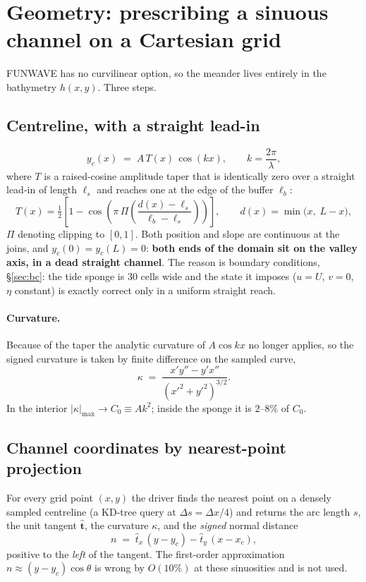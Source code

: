 \documentclass[11pt,a4paper]{article}
\begin{document}
\section{Geometry: prescribing a sinuous channel on a Cartesian grid}
\label{sec:geom}

FUNWAVE has no curvilinear option, so the meander lives entirely in the bathymetry
$h(x,y)$. Three steps.

\subsection{Centreline, with a straight lead-in}
\begin{equation}
  y_c(x) \;=\; A\,T(x)\,\cos(kx), \qquad k=\frac{2\pi}{\lambda},
  \label{eq:centreline}
\end{equation}
where $T$ is a raised-cosine amplitude taper that is identically zero over a straight
lead-in of length $\ell_s$ and reaches one at the edge of the buffer $\ell_b$:
\begin{equation}
  T(x)=\tfrac12\left[1-\cos\!\left(\pi\,\Pi\!\left(\frac{d(x)-\ell_s}{\ell_b-\ell_s}\right)\right)\right],
  \qquad d(x)=\min\big(x,\;L-x\big),
  \label{eq:taper}
\end{equation}
$\Pi$ denoting clipping to $[0,1]$. Both position and slope are continuous at the joins,
and $y_c(0)=y_c(L)=0$: \textbf{both ends of the domain sit on the valley axis, in a dead
straight channel}. The reason is boundary conditions, \S\ref{sec:bc}: the tide sponge is
30 cells wide and the state it imposes ($u=U$, $v=0$, $\eta$ constant) is exactly correct
only in a uniform straight reach.

\paragraph{Curvature.} Because of the taper the analytic curvature of $A\cos kx$ no longer
applies, so the signed curvature is taken by finite difference on the sampled curve,
\begin{equation}
  \kappa \;=\; \frac{x'y''-y'x''}{\left(x'^2+y'^2\right)^{3/2}} .
  \label{eq:kappa}
\end{equation}
In the interior $|\kappa|_{\max}\to C_0\equiv Ak^2$; inside the sponge it is $2$--$8\%$ of
$C_0$.

\subsection{Channel coordinates by nearest-point projection}
For every grid point $(x,y)$ the driver finds the nearest point on a densely sampled
centreline (a KD-tree query at $\Delta s=\Delta x/4$) and returns the arc length $s$, the
unit tangent $\hat{\bm t}$, the curvature $\kappa$, and the \emph{signed} normal distance
\begin{equation}
  n \;=\; \hat t_x\,(y-y_c) - \hat t_y\,(x-x_c) ,
  \label{eq:n}
\end{equation}
positive to the \emph{left} of the tangent. The first-order approximation
$n\approx(y-y_c)\cos\theta$ is wrong by $O(10\%)$ at these sinuosities and is not used.
\end{document}
